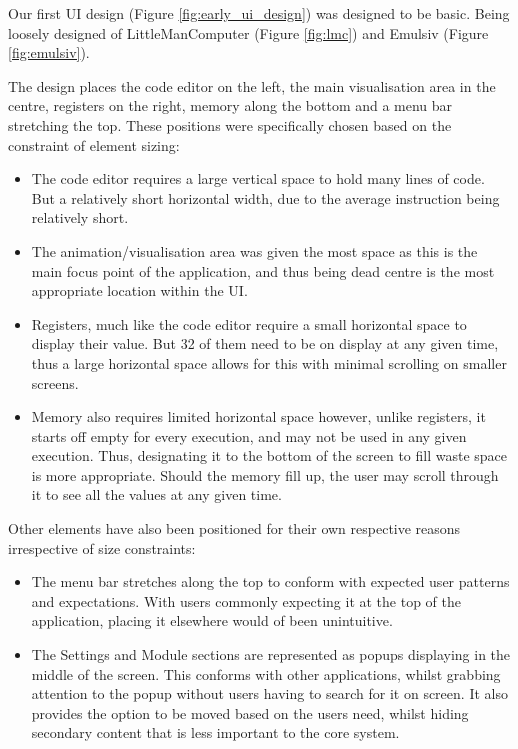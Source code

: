 Our first \ac{UI} design (Figure \ref{fig:early_ui_design}) was designed to be basic. Being loosely designed of LittleManComputer (Figure \ref{fig:lmc}) and Emulsiv (Figure \ref{fig:emulsiv}).

The design places the code editor on the left, the main visualisation area in the centre, registers on the right, memory along the bottom and a menu bar stretching the top. These positions were specifically chosen based on the constraint of element sizing:
\begin{itemize}
    \item The code editor requires a large vertical space to hold many lines of code. But a relatively short horizontal width, due to the average instruction being relatively short.
    \item The animation/visualisation area was given the most space as this is the main focus point of the application, and thus being dead centre is the most appropriate location within the \ac{UI}.
    \item Registers, much like the code editor require a small horizontal space to display their value. But 32 of them need to be on display at any given time, thus a large horizontal space allows for this with minimal scrolling on smaller screens.
    \item Memory also requires limited horizontal space however, unlike registers, it starts off empty for every execution, and may not be used in any given execution. Thus, designating it to the bottom of the screen to fill waste space is more appropriate. Should the memory fill up, the user may scroll through it to see all the values at any given time.
\end{itemize}

Other elements have also been positioned for their own respective reasons irrespective of size constraints:
\begin{itemize}
    \item The menu bar stretches along the top to conform with expected user patterns and expectations. With users commonly expecting it at the top of the application, placing it elsewhere would of been unintuitive.
    \item The Settings and Module sections are represented as popups displaying in the middle of the screen. This conforms with other applications, whilst grabbing attention to the popup without users having to search for it on screen. It also provides the option to be moved based on the users need, whilst hiding secondary content that is less important to the core system.
\end{itemize}

